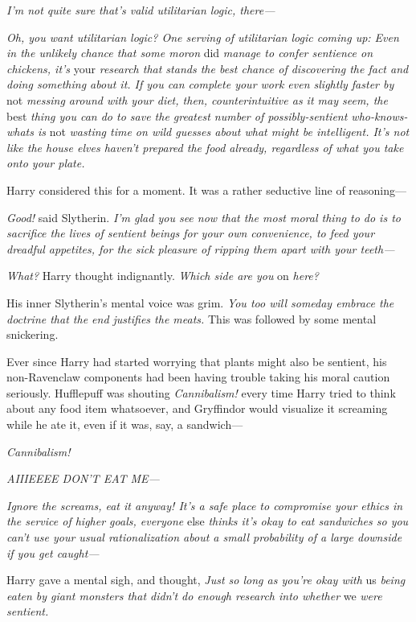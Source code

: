 \emph{I'm not quite sure that's valid utilitarian logic, there---}

\emph{Oh, you want utilitarian logic? One serving of utilitarian logic coming
up: Even in the unlikely chance that some moron} did \emph{manage to confer
sentience on chickens, it's} your \emph{research that stands the best chance of
discovering the fact and doing something about it. If you can complete your
work even slightly faster by} not \emph{messing around with your diet, then,
counterintuitive as it may seem, the} best \emph{thing you can do to save the
greatest number of possibly-sentient who-knows-whats is} not \emph{wasting time
on wild guesses about what might be intelligent. It's not like the house elves
haven't prepared the food already, regardless of what you take onto your plate.}

Harry considered this for a moment. It was a rather seductive line of
reasoning---

\emph{Good!} said Slytherin. \emph{I'm glad you see now that the most moral
thing to do is to sacrifice the lives of sentient beings for your own
convenience, to feed your dreadful appetites, for the sick pleasure of ripping
them apart with your teeth---}

\emph{What?} Harry thought indignantly. \emph{Which side are you} on 
\emph{here?}

His inner Slytherin's mental voice was grim. \emph{You too will someday embrace
the doctrine{\el} that the end justifies the meats.} This was followed by
some mental snickering.

Ever since Harry had started worrying that plants might also be sentient, his
non-Ravenclaw components had been having trouble taking his moral caution
seriously. Hufflepuff was shouting \emph{Cannibalism!} every time Harry tried
to think about any food item whatsoever, and Gryffindor would visualize it
screaming while he ate it, even if it was, say, a sandwich---

\emph{Cannibalism!}

\emph{AIIIEEEE DON'T EAT ME---}

\emph{Ignore the screams, eat it anyway! It's a safe place to compromise your
ethics in the service of higher goals, everyone} else \emph{thinks it's okay to
eat sandwiches so you can't use your usual rationalization about a small
probability of a large downside if you get caught---}

Harry gave a mental sigh, and thought, \emph{Just so long as you're okay with}
us \emph{being eaten by giant monsters that didn't do enough research into
whether} we \emph{were sentient.}

